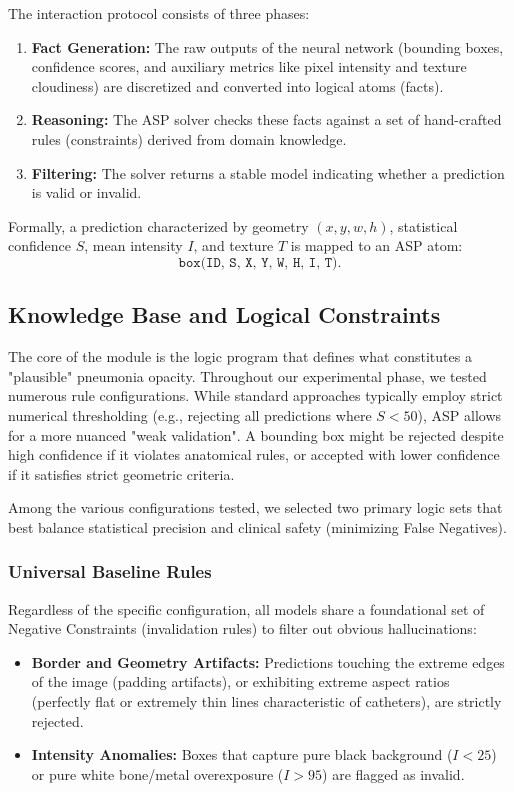 \documentclass[a4paper,fleqn]{cas-dc}
\begin{document}
The interaction protocol consists of three phases:
\begin{enumerate}
	\item \textbf{Fact Generation:} The raw outputs of the neural network (bounding boxes, confidence scores, and auxiliary metrics like pixel intensity and texture cloudiness) are discretized and converted into logical atoms (facts).
	\item \textbf{Reasoning:} The ASP solver checks these facts against a set of hand-crafted rules (constraints) derived from domain knowledge.
	\item \textbf{Filtering:} The solver returns a stable model indicating whether a prediction is valid or invalid.
\end{enumerate}

Formally, a prediction characterized by geometry $(x, y, w, h)$, statistical confidence $S$, mean intensity $I$, and texture $T$ is mapped to an ASP atom:
\begin{equation}
	\texttt{box(ID, S, X, Y, W, H, I, T).}
\end{equation}

\subsection{Knowledge Base and Logical Constraints}
The core of the module is the logic program that defines what constitutes a "plausible" pneumonia opacity. Throughout our experimental phase, we tested numerous rule configurations. While standard approaches typically employ strict numerical thresholding (e.g., rejecting all predictions where $S < 50$), ASP allows for a more nuanced "weak validation". A bounding box might be rejected despite high confidence if it violates anatomical rules, or accepted with lower confidence if it satisfies strict geometric criteria. 

Among the various configurations tested, we selected two primary logic sets that best balance statistical precision and clinical safety (minimizing False Negatives). 

\subsubsection{Universal Baseline Rules}
Regardless of the specific configuration, all models share a foundational set of Negative Constraints (invalidation rules) to filter out obvious hallucinations:
\begin{itemize}
	\item \textbf{Border and Geometry Artifacts:} Predictions touching the extreme edges of the image (padding artifacts), or exhibiting extreme aspect ratios (perfectly flat or extremely thin lines characteristic of catheters), are strictly rejected.
	\item \textbf{Intensity Anomalies:} Boxes that capture pure black background ($I < 25$) or pure white bone/metal overexposure ($I > 95$) are flagged as invalid.
\end{itemize}
\end{document}

